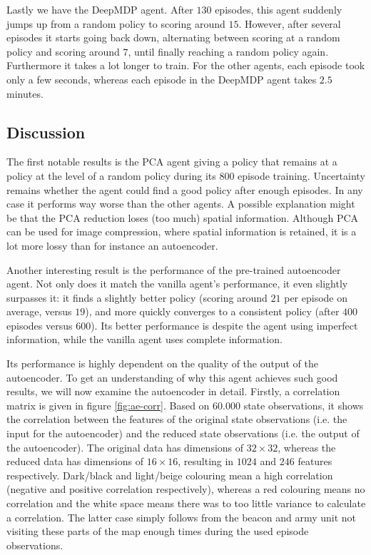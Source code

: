 Lastly we have the DeepMDP agent. After $130$ episodes, this agent suddenly jumps up from a random policy to scoring around $15$. However, after several episodes it starts going back down, alternating between scoring at a random policy and scoring around $7$, until finally reaching a random policy again. Furthermore it takes a lot longer to train. For the other agents, each episode took only a few seconds, whereas each episode in the DeepMDP agent takes $2.5$ minutes.

\subsection{Discussion}\label{research-discussion}
The first notable results is the PCA agent giving a policy that remains at a policy at the level of a random policy during its $800$ episode training.  Uncertainty remains whether the agent could find a good policy after enough episodes. In any case it performs way worse than the other agents. A possible explanation might be that the PCA reduction loses (too much) spatial information. Although PCA can be used for image compression, where spatial information is retained, it is a lot more lossy than for instance an autoencoder.

Another interesting result is the performance of the pre-trained autoencoder agent. Not only does it match the vanilla agent's performance, it even slightly surpasses it: it finds a slightly better policy (scoring around $21$ per episode on average, versus $19$), and more quickly converges to a consistent policy (after $400$ episodes versus $600$). Its better performance is despite the agent using imperfect information, while the vanilla agent uses complete information.

Its performance is highly dependent on the quality of the output of the autoencoder. To get an understanding of why this agent achieves such good results, we will now examine the autoencoder in detail. Firstly, a correlation matrix is given in figure \ref{fig:ae-corr}. Based on $60.000$ state observations, it shows the correlation between the features of the original state observations (i.e. the input for the autoencoder) and the reduced state observations (i.e. the output of the autoencoder). The original data has dimensions of $32 \times 32$, whereas the reduced data has dimensions of $16 \times 16$, resulting in $1024$ and $246$ features respectively. Dark/black and light/beige colouring mean a high correlation (negative and positive correlation respectively), whereas a red colouring means no correlation and the white space means there was to too little variance to calculate a correlation. The latter case simply follows from the beacon and army unit not visiting these parts of the map enough times during the used episode observations.

